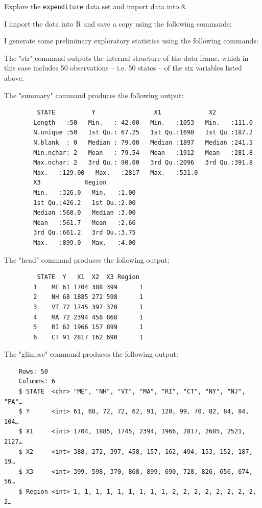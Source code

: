 \documentclass[12pt,letterpaper]{article}
\begin{document}
	\vspace{.5cm}
	\noindent Explore the \texttt{expenditure} data set and import data into \texttt{R}.
	\vspace{.5cm}
	
	I import the data into R and save a copy using the following commands:
	
	
	I generate some preliminary exploratory statistics using the following commands:
	
	
	The "str" command outputs the internal structure of the data frame, which in this case includes 50 observations -- i.e. 50 states -- of the six variables listed above. 
	
		\vspace{.5cm}
	The "summary" command produces the following output: 
	
	\begin{verbatim}
		 STATE          Y                X1             X2       
		Length   :50   Min.   : 42.00   Min.   :1053   Min.   :111.0  
		N.unique :50   1st Qu.: 67.25   1st Qu.:1698   1st Qu.:187.2  
		N.blank  : 0   Median : 79.00   Median :1897   Median :241.5  
		Min.nchar: 2   Mean   : 79.54   Mean   :1912   Mean   :281.8  
		Max.nchar: 2   3rd Qu.: 90.00   3rd Qu.:2096   3rd Qu.:391.8  
		Max.   :129.00   Max.   :2817   Max.   :531.0  
		X3            Region    
		Min.   :326.0   Min.   :1.00  
		1st Qu.:426.2   1st Qu.:2.00  
		Median :568.0   Median :3.00  
		Mean   :561.7   Mean   :2.66  
		3rd Qu.:661.2   3rd Qu.:3.75  
		Max.   :899.0   Max.   :4.00  
	\end{verbatim}
	
		\vspace{.5cm}
	
	The "head" command produces the following output:
	
	\begin{verbatim}
		 STATE  Y   X1  X2  X3 Region
		1    ME 61 1704 388 399      1
		2    NH 68 1885 272 598      1
		3    VT 72 1745 397 370      1
		4    MA 72 2394 458 868      1
		5    RI 62 1966 157 899      1
		6    CT 91 2817 162 690      1
	\end{verbatim}
	
	\vspace{.5cm}

	The "glimpse" command produces the following output:
	
\begin{verbatim}
	Rows: 50
	Columns: 6
	$ STATE  <chr> "ME", "NH", "VT", "MA", "RI", "CT", "NY", "NJ", "PA"…
	$ Y      <int> 61, 68, 72, 72, 62, 91, 120, 99, 70, 82, 84, 84, 104…
	$ X1     <int> 1704, 1885, 1745, 2394, 1966, 2817, 2685, 2521, 2127…
	$ X2     <int> 388, 272, 397, 458, 157, 162, 494, 153, 152, 187, 19…
	$ X3     <int> 399, 598, 370, 868, 899, 690, 728, 826, 656, 674, 56…
	$ Region <int> 1, 1, 1, 1, 1, 1, 1, 1, 1, 2, 2, 2, 2, 2, 2, 2, 2, 2…
\end{verbatim}
	
\end{document}
